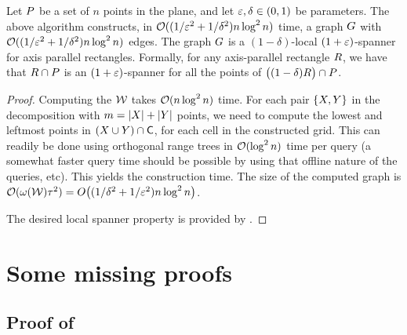 \documentclass[12pt]{article}%
\begin{document}
\begin{theorem}
    Let $P$ be a set of $n$ points in the plane, and let
    $\varepsilon, \delta \in (0,1)$ be parameters. The above algorithm
    constructs, in $\mathcal{O}((1/\varepsilon^2 + 1/\delta^2) n \log^2 n)$ time, a
    graph $G$ with $\mathcal{O}((1/\varepsilon^2 + 1/\delta^2) n \log^2 n)$
    edges. The graph $G$ is a $(1-\delta)$-local $(1+\varepsilon)$-spanner
    for axis parallel rectangles. Formally, for any axis-parallel
    rectangle $R$, we have that $R \cap P$ is an
    $(1+\varepsilon)$-spanner for all the points of
    $\bigl((1-\delta)R \bigr)\cap P$.
\end{theorem}
\begin{proof}
    Computing the \QSPD $\mathcal{W}$ takes $\mathcal{O}(n \log^2 n)$ time. For each
    pair $\{X, Y\}$ in the decomposition with
    $m = |X| + |Y|$ points, we need to compute the lowest and
    leftmost points in $(X \cup Y) \cap \mathsf{C}$, for each cell in
    the constructed grid. This can readily be done using orthogonal
    range trees in $\mathcal{O}( \log^2 n)$ time per query (a somewhat faster
    query time should be possible by using that offline nature of the
    queries, etc). This yields the construction time. The size of the
    computed graph is
    $\Of(\WeightX{\WS} \gConst^2) = O\bigl((1/\delta^2 + 1/\eps^2) n
    \log^2 n\bigr)$.

    The desired local spanner property is provided by
    .
\end{proof}









% 


\appendix
\section{Some missing proofs}

\subsection{Proof of }

%
{%
   \LemmaRefineDWBody{}%
}
   
\end{document}
